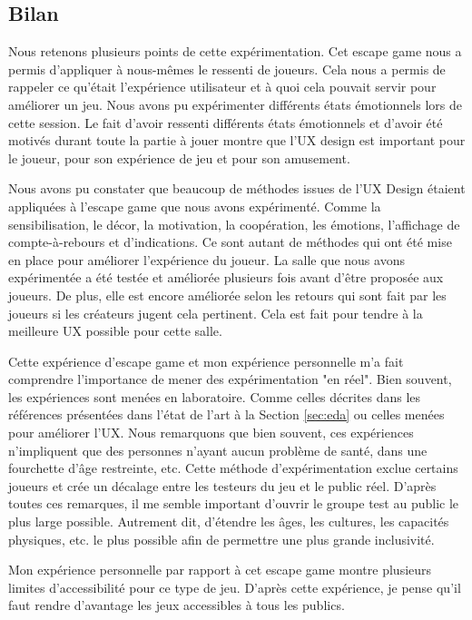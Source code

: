 \documentclass[11pt]{article}
\begin{document}
	\subsection{Bilan}\label{sec:escapebilan}
		Nous retenons plusieurs points de cette expérimentation.
		Cet escape game nous a permis d'appliquer à nous-mêmes le ressenti de joueurs.
		Cela nous a permis de rappeler ce qu'était l'expérience utilisateur et à quoi cela pouvait servir pour améliorer un jeu.
		Nous avons pu expérimenter différents états émotionnels lors de cette session.
		Le fait d'avoir ressenti différents états émotionnels et d'avoir été motivés durant toute la partie à jouer montre que l'UX design est important pour le joueur, pour son expérience de jeu et pour son amusement.\par
		Nous avons pu constater que beaucoup de méthodes issues de l'UX Design étaient appliquées à l'escape game que nous avons expérimenté.
		Comme la sensibilisation, le décor, la motivation, la coopération, les émotions, l'affichage de compte-à-rebours et d'indications.
		Ce sont autant de méthodes qui ont été mise en place pour améliorer l'expérience du joueur.
		La salle que nous avons expérimentée a été testée et améliorée plusieurs fois avant d'être proposée aux joueurs.
		De plus, elle est encore améliorée selon les retours qui sont fait par les joueurs si les créateurs jugent cela pertinent.
		Cela est fait pour tendre à la meilleure UX possible pour cette salle.\par
		Cette expérience d'escape game et mon expérience personnelle m'a fait comprendre l'importance de mener des expérimentation "en réel".
		Bien souvent, les expériences sont menées en laboratoire.
		Comme celles décrites dans les références présentées dans l'état de l'art à la Section \ref{sec:eda} ou celles menées pour améliorer l'UX.
		Nous remarquons que bien souvent, ces expériences n'impliquent que des personnes n'ayant aucun problème de santé, dans une fourchette d'âge restreinte, etc.
		Cette méthode d'expérimentation exclue certains joueurs et crée un décalage entre les testeurs du jeu et le public réel.
		D'après toutes ces remarques, il me semble important d'ouvrir le groupe test au public le plus large possible.
		Autrement dit, d'étendre les âges, les cultures, les capacités physiques, etc. le plus possible afin de permettre une plus grande inclusivité.\par
		Mon expérience personnelle par rapport à cet escape game montre plusieurs limites d'accessibilité pour ce type de jeu.
		D'après cette expérience, je pense qu'il faut rendre d'avantage les jeux accessibles à tous les publics.
\end{document}
